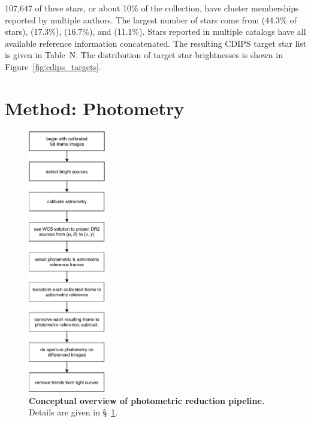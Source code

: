 \documentclass[12pt,twocolumn,tighten]{aastex62}
\begin{document}
107{,}647 of these stars, or about
10\% of the collection, have cluster memberships reported by
multiple authors.  The largest number of stars come from
\citealt{dias_proper_2014} (44.3\% of stars), \citealt{Kharchenko_et_al_2013}
(17.3\%), \citealt{cantat-gaudin_gaia_2018} (16.7\%), and \citealt{zari_3d_2018}
(11.1\%).
Stars reported in multiple catalogs have all available reference information
concatenated.  
The resulting CDIPS target star list is given in Table~N.
The distribution of target star brightnesses is shown in
Figure~\ref{fig:cdips_targets}.





\section{Method: Photometry}
\label{sec:method}

\begin{figure}[t]
	\begin{center}
		\leavevmode
		\includegraphics[width=0.3\textwidth]{pipelineoverview.pdf}
	\end{center}
	\vspace{-0.2cm}
	\caption{
    {\bf Conceptual overview of photometric reduction pipeline.}
    Details are given in \S~\ref{sec:method}.
	\label{fig:pipeline}
	}
\end{figure}
\end{document}
